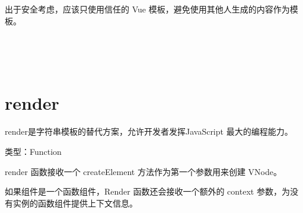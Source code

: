 出于安全考虑，应该只使用信任的 Vue 模板，避免使用其他人生成的内容作为模板。


\begin{lstlisting}[language=JavaScript]

\end{lstlisting}




\begin{lstlisting}[language=JavaScript]

\end{lstlisting}




\begin{lstlisting}[language=JavaScript]

\end{lstlisting}




\begin{lstlisting}[language=JavaScript]

\end{lstlisting}




\begin{lstlisting}[language=JavaScript]

\end{lstlisting}







\section{render}




render是字符串模板的替代方案，允许开发者发挥JavaScript 最大的编程能力。

\begin{compactitem}
\item 类型：Function
\end{compactitem}

render 函数接收一个 createElement 方法作为第一个参数用来创建 VNode。


如果组件是一个函数组件，Render 函数还会接收一个额外的 context 参数，为没有实例的函数组件提供上下文信息。

\begin{lstlisting}[language=JavaScript]

\end{lstlisting}




